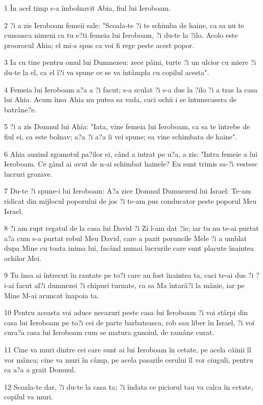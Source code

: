 \par 1 În acel timp s-a îmbolnavit Abia, fiul lui Ieroboam.
\par 2 ?i a zis Ieroboam femeii sale: "Scoala-te ?i te schimba de haine, ca sa nu te cunoasca nimeni ca tu e?ti femeia lui Ieroboam, ?i du-te la ?ilo. Acolo este proorocul Ahia; el mi-a spus ca voi fi rege peste acest popor.
\par 3 Ia cu tine pentru omul lui Dumnezeu: zece pâini, turte ?i un ulcior cu miere ?i du-te la el, ca el î?i va spune ce se va întâmpla cu copilul acesta".
\par 4 Femeia lui Ieroboam a?a a ?i facut; s-a sculat ?i s-a dus la ?ilo ?i a tras la casa lui Ahia. Acum însa Ahia nu putea sa vada, caci ochii i se întunecasera de batrâne?e.
\par 5 ?i a zis Domnul lui Ahia: "Iata, vine femeia lui Ieroboam, ca sa te întrebe de fiul ei, ca este bolnav; a?a ?i a?a îi vei spune; ea vine schimbata de haine".
\par 6 Ahia auzind zgomotul pa?ilor ei, când a intrat pe u?a, a zis: "Intra femeie a lui Ieroboam. Ce gând ai avut de n-ai schimbat hainele? Eu sunt trimis sa-?i vestesc lucruri grozave.
\par 7 Du-te ?i spune-i lui Ieroboam: A?a zice Domnul Dumnezeul lui Israel: Te-am ridicat din mijlocul poporului de jos ?i te-am pus conducator peste poporul Meu Israel.
\par 8 ?i am rupt regatul de la casa lui David ?i Zi l-am dat ?ie; iar tu nu te-ai purtat a?a cum s-a purtat robul Meu David, care a pazit poruncile Mele ?i a umblat dupa Mine cu toata inima lui, facând numai lucrurile care sunt placute înaintea ochilor Mei.
\par 9 Tu însa ai întrecut în rautate pe to?i care au fost înaintea ta, caci te-ai dus ?i ?i-ai facut al?i dumnezei ?i chipuri turnate, ca sa Ma întarâ?i la mânie, iar pe Mine M-ai aruncat înapoia ta.
\par 10 Pentru aceasta voi aduce necazuri peste casa lui Ieroboam ?i voi stârpi din casa lui Ieroboam pe to?i cei de parte barbateasca, rob sau liber în Israel, ?i voi cura?a casa lui Ieroboam cum se matura gunoiul, de ramâne curat.
\par 11 Cine va muri dintre cei care sunt ai lui Ieroboam în cetate, pe acela câinii îl vor mânca; cine va muri în câmp, pe acela pasarile cerului îl vor ciuguli, pentru ca a?a a grait Domnul.
\par 12 Scoala-te dar, ?i du-te la casa ta; ?i îndata ce piciorul tau va calca în cetate, copilul va muri.
